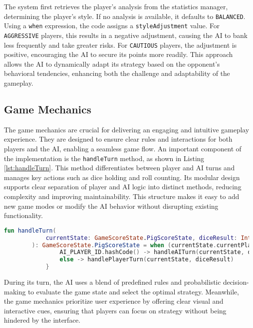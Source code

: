 The system first retrieves the player's analysis from the statistics manager, determining the player's style. If no analysis is available, it defaults to \texttt{BALANCED}. Using a \texttt{when} expression, the code assigns a \texttt{styleAdjustment} value. For \texttt{AGGRESSIVE} players, this results in a negative adjustment, causing the AI to bank less frequently and take greater risks. For \texttt{CAUTIOUS} players, the adjustment is positive, encouraging the AI to secure its points more readily. This approach allows the AI to dynamically adapt its strategy based on the opponent's behavioral tendencies, enhancing both the challenge and adaptability of the gameplay.


\subsection{Game Mechanics}

The game mechanics are crucial for delivering an engaging and intuitive gameplay experience. They are designed to ensure clear rules and interactions for both players and the AI, enabling a seamless game flow.
An important component of the implementation is the \texttt{handleTurn} method, as shown in Listing \ref{lst:handleTurn}. This method differentiates between player and AI turns and manages key actions such as dice holding and roll counting. Its modular design supports clear separation of player and AI logic into distinct methods, reducing complexity and improving maintainability. This structure makes it easy to add new game modes or modify the AI behavior without disrupting existing functionality.

\begin{lstlisting}[language=Kotlin, caption={handleTurn Function}, label=lst:handleTurn]
    fun handleTurn(
            currentState: GameScoreState.PigScoreState, diceResult: Int? = null
        ): GameScoreState.PigScoreState = when (currentState.currentPlayerIndex) {
                AI_PLAYER_ID.hashCode() -> handleAITurn(currentState, diceResult)
                else -> handlePlayerTurn(currentState, diceResult)
            }
\end{lstlisting}

During its turn, the AI uses a blend of predefined rules and probabilistic decision-making to evaluate the game state and select the optimal strategy. Meanwhile, the game mechanics prioritize user experience by offering clear visual and interactive cues, ensuring that players can focus on strategy without being hindered by the interface.

